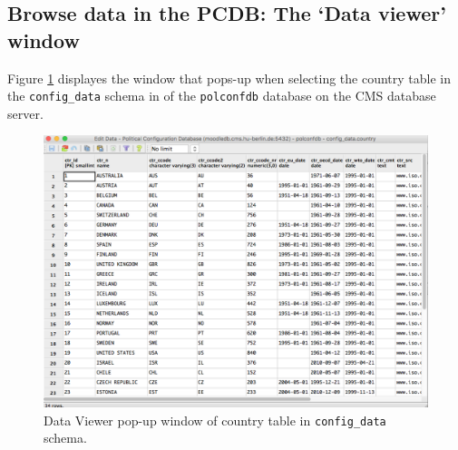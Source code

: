 \subsection{Browse data in the PCDB: The `Data viewer' window}\label{subsec_data_viewer} 
Figure \ref{fig_pgadmin3_data_viewer_country} displayes the window that pops-up when selecting the country table in the \texttt{config\_data} schema in of the \texttt{polconfdb} database on the CMS database server.

\begin{figure}[ht!]
\centering
  \includegraphics[width=.8\textwidth,trim= 0 0 0 0, clip]{pcdb_documentation_screenshots/pgadmin3_data_viewer_country.png}
    \caption{Data Viewer pop-up window of country table in \texttt{config\_data} schema.}
    \label{fig_pgadmin3_data_viewer_country}
\end{figure}

